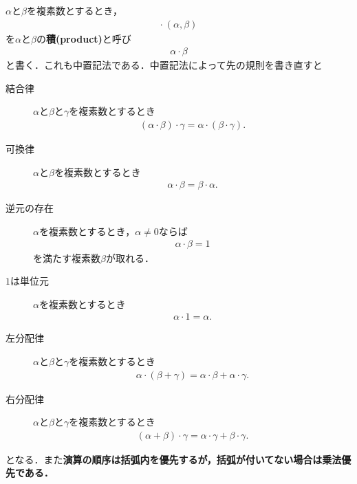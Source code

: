 	$\alpha$と$\beta$を複素数とするとき，
	\begin{align}
		\cdot\ (\alpha,\beta)
	\end{align}
	を$\alpha$と$\beta$の{\bf 積}{\bf (product)}と呼び
	\begin{align}
		\alpha \cdot \beta
	\end{align}
	と書く．これも中置記法である．中置記法によって先の規則を書き直すと
	\begin{description}
			\item[結合律] $\alpha$と$\beta$と$\gamma$を複素数とするとき
				\begin{align}
					(\alpha \cdot \beta) \cdot \gamma = \alpha \cdot (\beta \cdot \gamma).
				\end{align}
				
			\item[可換律]  $\alpha$と$\beta$を複素数とするとき
				\begin{align}
					\alpha \cdot \beta = \beta \cdot \alpha.
				\end{align}
				
			\item[逆元の存在] $\alpha$を複素数とするとき，$\alpha \neq 0$ならば
				\begin{align}
					\alpha \cdot \beta = 1
				\end{align}
				を満たす複素数$\beta$が取れる．
				
			\item[$1$は単位元] $\alpha$を複素数とするとき
				\begin{align}
					\alpha \cdot 1 = \alpha.
				\end{align}
				
			\item[左分配律] $\alpha$と$\beta$と$\gamma$を複素数とするとき
				\begin{align}
					\alpha \cdot (\beta + \gamma) = \alpha \cdot \beta + \alpha \cdot \gamma.
				\end{align}
				
			\item[右分配律] $\alpha$と$\beta$と$\gamma$を複素数とするとき
				\begin{align}
					(\alpha + \beta) \cdot \gamma = \alpha \cdot \gamma + \beta \cdot \gamma.
				\end{align}
	\end{description}
	となる．また{\bf 演算の順序は括弧内を優先するが，括弧が付いてない場合は乗法優先である．}
	
